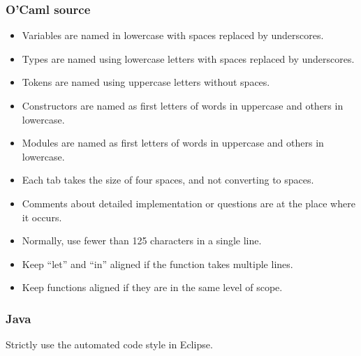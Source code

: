\documentclass[12pt,psfig,a4]{article}
\begin{document}
\subsubsection{O'Caml source}
\begin{itemize}
\item Variables are named in lowercase with spaces replaced by underscores.

\item Types are named using lowercase letters with spaces replaced by underscores.

\item Tokens are named using uppercase letters without spaces.

\item Constructors are named as first letters of words in uppercase and others in lowercase.

\item Modules are named as first letters of words in uppercase and others in lowercase.

\item Each tab takes the size of four spaces, and not converting to spaces.

\item Comments about detailed implementation or questions are at the place where it occurs.

\item Normally, use fewer than 125 characters in a single line.

\item Keep ``let'' and ``in'' aligned if the function takes multiple lines.

\item Keep functions aligned if they are in the same level of scope.
\end{itemize}

\subsubsection{Java}
Strictly use the automated code style in Eclipse.
\end{document}
